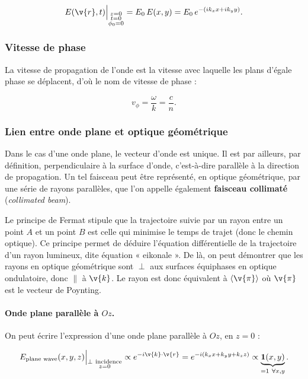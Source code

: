 \[
  E(\v{r},t)\Big|_{\substack{z=0\\ t=0\\ \phi_0=0}}=E_0\,E(x,y)=E_0\,e^{-(ik_xx+ik_yy)} .
\]

\subsubsection{Vitesse de phase}

La vitesse de propagation de l'onde est la vitesse avec laquelle les plans
d'égale phase se déplacent, d'où le nom de vitesse de phase :

\[
  v_\phi=\frac{\omega}{k}=\frac{c}{n}.
\]

\subsubsection{Lien entre onde plane et optique géométrique}

Dans le cas d'une onde plane, le vecteur d'onde est unique. Il est par ailleurs,
par définition, perpendiculaire à la surface d'onde, c'est-à-dire parallèle à la
direction de propagation. Un tel faisceau peut être représenté, en optique
géométrique, par une série de rayons parallèles, que l'on appelle également
\textbf{faisceau collimaté} (\textit{collimated beam}).

\begin{remark}
  Le principe de Fermat stipule que la trajectoire suivie par un rayon entre un
  point $A$ et un point $B$ est celle qui minimise le temps de trajet (donc le
  chemin optique). Ce principe permet de déduire l'équation différentielle de la
  trajectoire d'un rayon lumineux, dite équation « eikonale ». De là, on peut
  démontrer que les rayons en optique géométrique sont $\perp$ aux surfaces
  équiphases en optique ondulatoire, donc $\parallel$ à $\v{k}$. Le rayon est
  donc équivalent à $\langle\v{\pi}\rangle$ où $\v{\pi}$ est le vecteur de
  Poynting.
\end{remark}

\paragraph{Onde plane parallèle à $Oz$.} On peut écrire l'expression d'une
onde plane parallèle à $Oz$, en $z=0$ :

\[
  E_{\text{plane wave}}(x,y,z)\Big|_{\substack{\perp\ \text{incidence}\\ z=0}}
  \propto e^{-i\v{k}\cdot\v{r}}=e^{-i(k_xx+k_yy+k_zz)}
  \propto \underbrace{\mathbf{1}(x,y)}_{=1\ \forall x,y} .
\]

